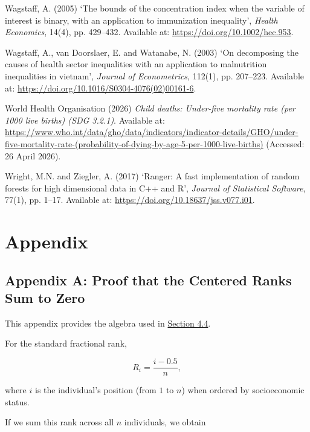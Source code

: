 \documentclass[
  11pt,
  a4paper,
]{article}
\newlength{\cslhangindent}
\newenvironment{CSLReferences}[2] %
 {\begin{list}{}{%
  \setlength{\itemindent}{0pt}
  \setlength{\leftmargin}{0pt}
  \setlength{\parsep}{0pt}
  \ifodd #1
   \setlength{\leftmargin}{\cslhangindent}
   \setlength{\itemindent}{-1\cslhangindent}
  \fi
  \setlength{\itemsep}{#2\baselineskip}}}
 {\end{list}}
\begin{document}
\begin{CSLReferences}{0}{1}
Wagstaff, A. (2005) {`The bounds of the concentration index when the
variable of interest is binary, with an application to immunization
inequality'}, \emph{Health Economics}, 14(4), pp. 429--432. Available
at: \url{https://doi.org/10.1002/hec.953}.

{Wagstaff, A., van Doorslaer, E. and Watanabe, N.} (2003) {`On
decomposing the causes of health sector inequalities with an application
to malnutrition inequalities in vietnam'}, \emph{Journal of
Econometrics}, 112(1), pp. 207--223. Available at:
\url{https://doi.org/10.1016/S0304-4076(02)00161-6}.

World Health Organisation (2026) \emph{Child deaths: Under-five
mortality rate (per 1000 live births) (SDG 3.2.1)}. Available at:
\url{https://www.who.int/data/gho/data/indicators/indicator-details/GHO/under-five-mortality-rate-(probability-of-dying-by-age-5-per-1000-live-births)}
(Accessed: 26 April 2026).

Wright, M.N. and Ziegler, A. (2017) {`Ranger: A fast implementation of
random forests for high dimensional data in {C++} and {R}'},
\emph{Journal of Statistical Software}, 77(1), pp. 1--17. Available at:
\url{https://doi.org/10.18637/jss.v077.i01}.

\end{CSLReferences}

\section{Appendix}\label{sec-appendix}

\subsection{Appendix A: Proof that the Centered Ranks Sum to
Zero}\label{app-centered-rank-proof}

This appendix provides the algebra used in
\hyperref[sec-shap-decomposition-definition]{Section 4.4}.

For the standard fractional rank,

\[
R_i = \frac{i - 0.5}{n},
\]

where \(i\) is the individual's position (from \(1\) to \(n\)) when
ordered by socioeconomic status.

If we sum this rank across all \(n\) individuals, we obtain
\end{document}
